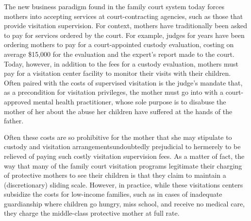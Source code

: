  


\noindent{}The new business paradigm found in the family court system today
forces mothers into accepting services at court-contracting agencies,
such as those that provide visitation supervision. For context, mothers have traditionally been asked to pay for services ordered by the
court. For example, judges for years have been ordering mothers to pay
for a court-appointed custody evaluation, costing on average \$15,000
for the evaluation and the expert's report made to the court. Today,
however, in addition to the fees for a custody evaluation, 
mothers must pay for a visitation center facility to monitor their visits with their children. Often paired with the costs of supervised visitation is
the judge's mandate that, as a precondition for visitation privileges, the
mother must go into  with a court-approved mental health
practitioner, whose sole purpose is to disabuse the mother of 
her  about the abuse her children 
have suffered at the hands of the father. \pfl{}

Often these costs are so prohibitive for the mother that
she may stipulate to custody and visitation arrangements\mdash{}undoubtedly
prejudicial to her\mdash{}merely to be relieved of paying such costly 
visitation supervision fees. As a matter of fact, the way that many
of the family court visitation
programs legitimate their charging of protective mothers to see their
children is that they claim to maintain a (discretionary) sliding scale.
However, in practice, while these visitations centers subsidize the costs
for low-income families, such as in cases of inadequate guardianship
where children go hungry, miss school, and receive no medical care,
they charge the middle-class protective mother at full rate. \pfl{}


